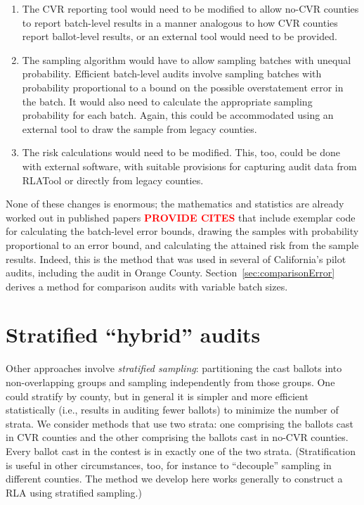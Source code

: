 \documentclass[runningheads]{llncs}
\begin{document}
\begin{enumerate}

  \item The CVR reporting tool would need to be modified to allow no-CVR counties to
report batch-level results in a manner analogous to how CVR counties report
ballot-level results, or an external tool would need to be provided.

  \item The sampling
algorithm would have to allow sampling batches with unequal probability.
Efficient batch-level audits involve sampling batches with probability proportional
to a bound on the possible overstatement error in the batch.
It would also need to calculate the appropriate sampling probability for each batch.
Again, this could be accommodated using an external tool to draw the sample from legacy counties.

  \item The risk calculations would need to be modified. 
This, too, could be done with external software, with suitable provisions for capturing audit data
from RLATool or directly from legacy counties.
\end{enumerate}

None of these changes is enormous; the mathematics and statistics are already worked out
in published papers \textbf{\textcolor{red}{PROVIDE CITES}} that include exemplar code for calculating the
batch-level error bounds, drawing the samples with probability proportional to an
error bound, and calculating the attained risk from the sample results.
Indeed, this is the method that was used in several of California's pilot audits,
including the audit in Orange County.
Section~\ref{sec:comparisonError} derives a method for comparison audits with variable batch sizes.

\section{Stratified ``hybrid'' audits} \label{sec:hybrid}

Other approaches involve \emph{stratified sampling}: partitioning the cast ballots
into non-overlapping groups and sampling independently from those groups.
One could stratify by county, but in general it is simpler and more efficient
statistically (i.e., results in auditing fewer ballots) to minimize the number of strata.
We consider methods that use two strata: one comprising the ballots cast in CVR counties and the other comprising the ballots cast in
no-CVR counties. 
Every ballot cast in the contest is in 
exactly one of the two strata. 
(Stratification is useful in other circumstances, too, for instance to ``decouple'' sampling
in different counties.
The method we develop here works generally to construct a RLA using stratified sampling.)
\end{document}
